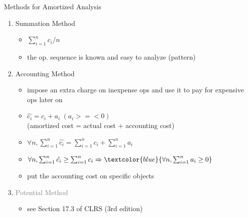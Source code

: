 \documentclass{beamer}
\begin{document}
\begin{frame}{Methods for Amortized Analysis}
  \begin{enumerate}
    \setlength{\itemsep}{0.30cm}
    \item Summation Method
      \begin{itemize}
        \item $\sum_{i = 1}^{n} c_i / n$
        \item the op. sequence is known and easy to analyze (pattern)
      \end{itemize}
    \item Accounting Method
	  \begin{itemize}
		\setlength{\itemsep}{0.15cm}
	    \item impose an extra charge on inexpense ops and use it to pay for
	    expensive ops later on
	    \item $\hat{c_i} = c_i + a_i \; (a_i >=< 0)$ \\ (amortized cost = actual
	    cost + accounting cost)
	    \item $\forall n, \sum_{i=1}^{n} \hat{c_i} = \sum_{i=1}^{n} c_i +
	    \sum_{i=1}^{n} a_i$
	    \item $\forall n, \sum_{i=1}^{n} \hat{c_i} \geq \sum_{i=1}^{n} c_i
	    \Rightarrow \textcolor{blue}{\forall n, \sum_{i=1}^{n} a_i \geq 0}$
	    \item put the accounting cost on specific objects
	  \end{itemize}
    \item \textcolor{gray}{Potential Method}
	  \begin{itemize}
	    \item see Section 17.3 of CLRS (3rd edition)
	  \end{itemize}
  \end{enumerate}
\end{frame}
\end{document}
